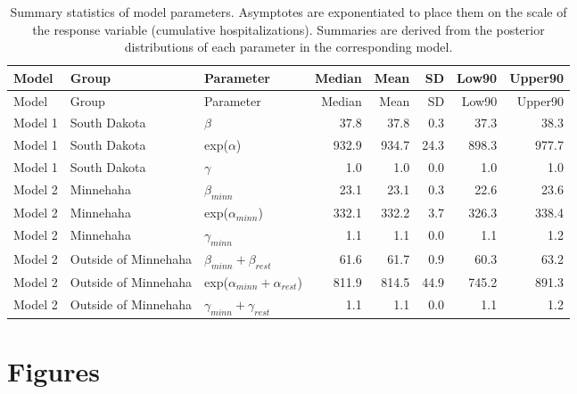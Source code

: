 \documentclass[
]{article}
\begin{document}
\newpage

\FloatBarrier

\begin{longtable}[]{@{}lllrrrrr@{}}
\caption{\label{tab:unnamed-chunk-2}Summary statistics of model parameters. Asymptotes are exponentiated to place them on the scale of the response variable (cumulative hospitalizations). Summaries are derived from the posterior distributions of each parameter in the corresponding model.}\tabularnewline
\toprule
Model & Group & Parameter & Median & Mean & SD & Low90 & Upper90\tabularnewline
\midrule
\endfirsthead
\toprule
Model & Group & Parameter & Median & Mean & SD & Low90 & Upper90\tabularnewline
\midrule
\endhead
Model 1 & South Dakota & \(\beta\) & 37.8 & 37.8 & 0.3 & 37.3 & 38.3\tabularnewline
Model 1 & South Dakota & exp(\(\alpha\)) & 932.9 & 934.7 & 24.3 & 898.3 & 977.7\tabularnewline
Model 1 & South Dakota & \(\gamma\) & 1.0 & 1.0 & 0.0 & 1.0 & 1.0\tabularnewline
Model 2 & Minnehaha & \(\beta_{minn}\) & 23.1 & 23.1 & 0.3 & 22.6 & 23.6\tabularnewline
Model 2 & Minnehaha & exp(\(\alpha_{minn}\)) & 332.1 & 332.2 & 3.7 & 326.3 & 338.4\tabularnewline
Model 2 & Minnehaha & \(\gamma_{minn}\) & 1.1 & 1.1 & 0.0 & 1.1 & 1.2\tabularnewline
Model 2 & Outside of Minnehaha & \(\beta_{minn} + \beta_{rest}\) & 61.6 & 61.7 & 0.9 & 60.3 & 63.2\tabularnewline
Model 2 & Outside of Minnehaha & exp(\(\alpha_{minn} + \alpha_{rest}\)) & 811.9 & 814.5 & 44.9 & 745.2 & 891.3\tabularnewline
Model 2 & Outside of Minnehaha & \(\gamma_{minn} + \gamma_{rest}\) & 1.1 & 1.1 & 0.0 & 1.1 & 1.2\tabularnewline
\bottomrule
\end{longtable}

\newpage

\FloatBarrier

\hypertarget{figures}{%
\section{Figures}\label{figures}}
\end{document}
